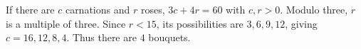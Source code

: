 If there are $c$ carnations and $r$ roses, $3c+4r=60$ with $c,r>0$. Modulo three, $r$ is a multiple of three. Since $r<15$, its possibilities are $3,6,9,12$, giving $c=16,12,8,4$. Thus there are $\boxed4$ bouquets.
